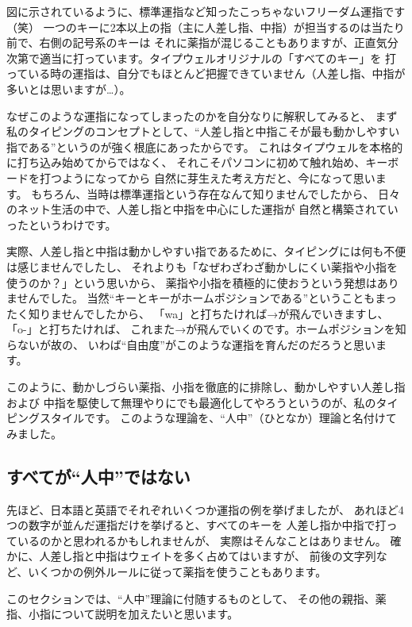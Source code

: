 図に示されているように、標準運指など知ったこっちゃないフリーダム運指です（笑）
一つのキーに2本以上の指（主に人差し指、中指）が担当するのは当たり前で、右側の記号系のキーは
それに薬指が混じることもありますが、正直気分次第で適当に打っています。タイプウェルオリジナルの「すべてのキー」を
打っている時の運指は、自分でもほとんど把握できていません（人差し指、中指が多いとは思いますが…）。


なぜこのような運指になってしまったのかを自分なりに解釈してみると、
まず私のタイピングのコンセプトとして、“人差し指と中指こそが最も動かしやすい指である”というのが強く根底にあったからです。
これはタイプウェルを本格的に打ち込み始めてからではなく、
それこそパソコンに初めて触れ始め、キーボードを打つようになってから
自然に芽生えた考え方だと、今になって思います。
もちろん、当時は標準運指という存在なんて知りませんでしたから、
日々のネット生活の中で、人差し指と中指を中心にした運指が
自然と構築されていったというわけです。


実際、人差し指と中指は動かしやすい指であるために、タイピングには何も不便は感じませんでしたし、
それよりも「なぜわざわざ動かしにくい薬指や小指を使うのか？」という思いから、
薬指や小指を積極的に使おうという発想はありませんでした。
当然“キーとキーがホームポジションである”ということもまったく知りませんでしたから、
「wa」と打ちたければ→が飛んでいきますし、「o-」と打ちたければ、
これまた→が飛んでいくのです。ホームポジションを知らないが故の、
いわば“自由度”がこのような運指を育んだのだろうと思います。


このように、動かしづらい薬指、小指を徹底的に排除し、動かしやすい人差し指および
中指を駆使して無理やりにでも最適化してやろうというのが、私のタイピングスタイルです。
このような理論を、“人中”（ひとなか）理論と名付けてみました。


\subsection{すべてが“人中”ではない}

先ほど、日本語と英語でそれぞれいくつか運指の例を挙げましたが、
あれほど4つの数字が並んだ運指だけを挙げると、すべてのキーを
人差し指か中指で打っているのかと思われるかもしれませんが、
実際はそんなことはありません。
確かに、人差し指と中指はウェイトを多く占めてはいますが、
前後の文字列など、いくつかの例外ルールに従って薬指を使うこともあります。

このセクションでは、“人中”理論に付随するものとして、
その他の親指、薬指、小指について説明を加えたいと思います。

